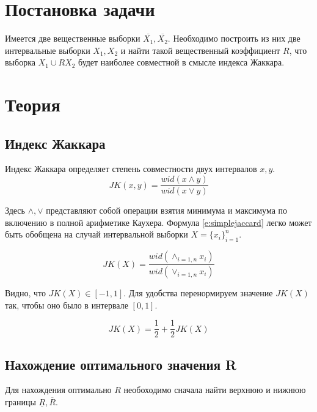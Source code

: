 \documentclass[a4paper,12pt]{article}
\begin{document}
    
    \newpage

    \tableofcontents
    \listoffigures
    \newpage

    \section{Постановка задачи}
    \quad Имеется две вещественные выборки $ \overline{X_{1}}, \overline{X_{2}} $.
    Необходимо построить из них две интервальные выборки $ X_{1}, X_{2} $
    и найти такой вещественный коэффициент $ R $, что выборка $ X_{1} \cup R X_{2} $
    будет наиболее совместной в смысле индекса Жаккара.

    \section{Теория}
    \subsection{Индекс Жаккара}
    \quad Индекс Жаккара определяет степень совместности двух интервалов $ x, y $.
    \begin{equation}
        JK(x, y) = \frac{wid(x \land y)}{wid(x \lor y)}
        \label{e:simplejaccard}
    \end{equation}

    Здесь $ \land, \lor $ представляют собой операции взятия минимума и максимума по включению
    в полной арифметике Каухера.
    Формула \ref{e:simplejaccard} легко может быть обобщена на случай интервальной выборки $ X = \{x_i\}_{i=1}^{n} $.
    
    \begin{equation}
        JK(X) = \frac{wid(\land_{i=1,n}x_i)}{wid(\lor_{i=1,n}x_i)}
        \label{e:jaccard}
    \end{equation}

    Видно, что $ JK(X) \in [-1, 1] $. Для удобства перенормируем значение $ JK(X) $
    так, чтобы оно было в интервале $ [0, 1] $.

    \begin{equation}
        JK(X) = \frac{1}{2} + \frac{1}{2} JK(X)
    \end{equation}

    \subsection{Нахождение оптимального значения R}
    Для нахождения оптимально $ R $ необоходимо сначала найти верхнюю и нижнюю границы $ \underline{R}, \overline{R} $.
\end{document}
